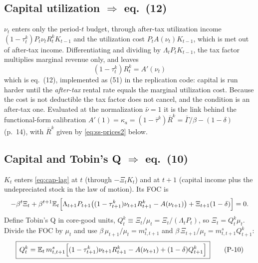 \subsection{Capital utilization \texorpdfstring{$\Rightarrow$}{=>} eq.\ (12)}
$\nu_t$ enters only the period-$t$ budget, through after-tax utilization income
$(1-\tau^k_t)P_t\nu_tR^k_tK_{t-1}$ and the utilization cost $P_tA(\nu_t)K_{t-1}$, which is met out of
after-tax income. Differentiating and dividing by $\Lambda_tP_tK_{t-1}$, the tax factor multiplies
marginal revenue only, and leaves
\begin{equation}\label{eq:12}
\boxed{\,(1-\tau^k_t)R^k_t=A'(\nu_t)\,}\tag{P-12}
\end{equation}
which is eq.\ (12), implemented as (51) in the replication code: capital is run harder until the
\emph{after-tax} rental rate equals the marginal utilization cost. Because the cost is not deductible the
tax factor does not cancel, and the condition is an after-tax one. Evaluated at the normalization
$\bar\nu=1$ it is the link behind the functional-form calibration
$A'(1)=\kappa_a=(1-\bar\tau^k)\bar R^k=\bar\Gamma/\beta-(1-\delta)$ (p.\ 14), with $\bar R^k$ given by
\eqref{eq:ss-prices2} below.

\subsection{Capital and Tobin's Q \texorpdfstring{$\Rightarrow$}{=>} eq.\ (10)}
$K_t$ enters \eqref{eq:cap-lag} at $t$ (through $-\Xi_t K_t$) and at $t+1$ (capital income plus the
undepreciated stock in the law of motion). Its FOC is
\[
-\beta^t\Xi_t+\beta^{t+1}\mathbb{E}_t\Big[\Lambda_{t+1}P_{t+1}\big((1-\tau^k_{t+1})\nu_{t+1}R^k_{t+1}-A(\nu_{t+1})\big)
+\Xi_{t+1}(1-\delta)\Big]=0.
\]
Define Tobin's Q in core-good units, $Q^k_t\equiv\Xi_t/\mu_t=\Xi_t/(\Lambda_tP_t)$, so
$\Xi_t=Q^k_t\mu_t$. Divide the FOC by $\mu_t$ and use $\beta\,\mu_{t+1}/\mu_t=m^s_{t,t+1}$ and
$\beta\,\Xi_{t+1}/\mu_t=m^s_{t,t+1}Q^k_{t+1}$:
\begin{equation}\label{eq:10}
\boxed{\,Q^k_t=\mathbb{E}_t\,m^s_{t,t+1}\Big[(1-\tau^k_{t+1})\nu_{t+1}R^k_{t+1}-A(\nu_{t+1})+(1-\delta)Q^k_{t+1}\Big]\,}
\tag{P-10}
\end{equation}

